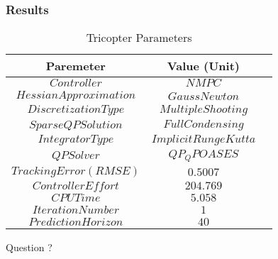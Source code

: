 \documentclass[13pt	]{beamer}
\begin{document}
\begin{frame}
\frametitle{Results}
\begin{table}[h!] 
  \caption{Tricopter Parameters} 
\begin{center} 
\begin{tabular}{|c|c|c|} 
  \hline 
  Paremeter & Value (Unit) \\ 
  \hline
  $Controller$ & $NMPC$ \\ 
   \hline
  $Hessian Approximation$ & $Gauss Newton$ \\ 
   \hline
  $Discretization Type$ & $Multiple Shooting$ \\ 
   \hline
  $Sparse QP Solution$ & $Full Condensing$ \\ 
   \hline
  $Integrator Type$ & $Implicit Runge Kutta$ \\ 
   \hline 
  $QP Solver$ & $QP_QPOASES$ \\ 
   \hline 
  $Tracking Error (RMSE)$ & $0.5007$ \\ 
    \hline 
  $Controller Effort$ & $204.769$ \\ 
    \hline 
  $CPU Time$  & $5.058$  \\ 
    \hline 
  $Iteration Number$ & $1$ \\ 
    \hline 
  $Prediction Horizon$ & $40$  \\ 
    \hline 
\end{tabular} 
\end{center} 
\end{table}
\end{frame}




\begin{frame}
\begin{center}
Question ?
\end{center}
\end{frame}
\end{document}
